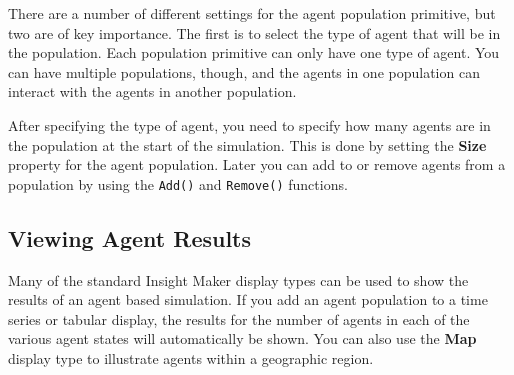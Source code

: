 \documentclass[]{memoir}
\renewcommand{\u}[1]{\textbf{#1}}
\renewcommand{\a}[1]{\textbf{#1}}
\begin{document}
There are a number of different settings for the agent population
primitive, but two are of key importance. The first is to select the
type of agent that will be in the population. Each population primitive
can only have one type of agent. You can have multiple populations,
though, and the agents in one population can interact with the agents in
another population.

After specifying the type of agent, you need to specify how many agents
are in the population at the start of the simulation. This is done by
setting the \a{Size} property for the agent population. Later you can
add to or remove agents from a population by using the \lstinline!Add()!
and \lstinline!Remove()! functions.

\subsection{Viewing Agent Results}

Many of the standard Insight Maker display types can be used to show the
results of an agent based simulation. If you add an agent population to
a time series or tabular display, the results for the number of agents
in each of the various agent states will automatically be shown. You can
also use the \u{Map} display type to illustrate agents within a
geographic region.

\FloatBarrier 
\end{document}
